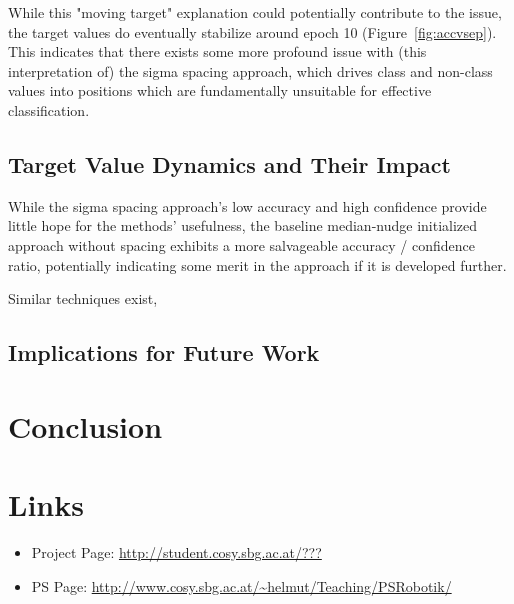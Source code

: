 \documentclass[12pt,fleqn,a4paper]{article}
\begin{document}
While this "moving target" explanation could potentially contribute to the issue, the target values do eventually stabilize around epoch 10 (Figure~\ref{fig:accvsep}). This indicates that there exists some more profound issue with (this interpretation of) the sigma spacing approach, which drives class and non-class values into positions which are fundamentally unsuitable for effective classification.

\subsection{Target Value Dynamics and Their Impact}
While the sigma spacing approach's low accuracy and high confidence provide little hope for the methods' usefulness, the baseline median-nudge initialized approach without spacing exhibits a more salvageable accuracy / confidence ratio, potentially indicating some merit in the approach if it is developed further.

Similar techniques exist, %

\subsection{Implications for Future Work}

\section{Conclusion}

\section{Links}

\begin{itemize}
\item Project Page: \url{http://student.cosy.sbg.ac.at/???}
\item PS Page:
\url{http://www.cosy.sbg.ac.at/~helmut/Teaching/PSRobotik/}

\end{itemize}

\end{document}

